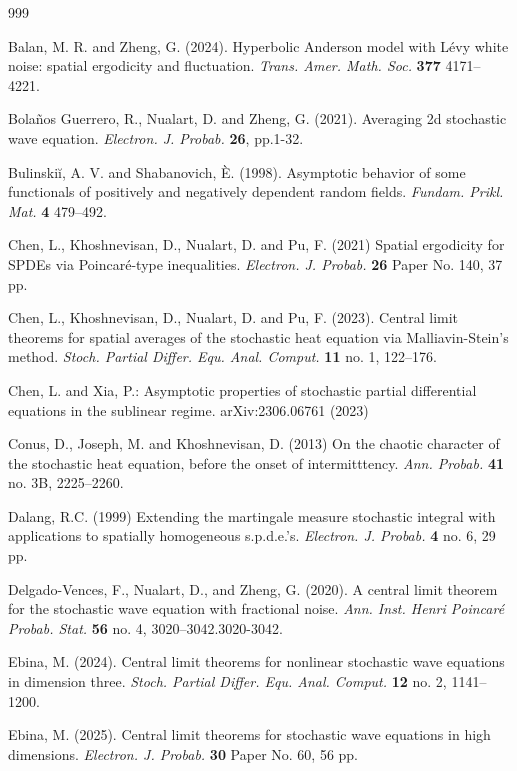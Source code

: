 \documentclass[12pt, reqno]{amsart}
\newcommand{\<}{\langle}
\renewcommand{\>}{\rangle}
\begin{document}
\begin{thebibliography}{999}

Balan, M. R. and Zheng, G. (2024).
Hyperbolic Anderson model with L\'{e}vy white noise: spatial ergodicity and fluctuation.
{\it Trans. Amer. Math. Soc.} {\bf 377} 4171--4221.


Bolaños Guerrero, R., Nualart, D. and Zheng, G. (2021). Averaging 2d stochastic wave equation. {\it Electron. J. Probab.} {\bf 26},  pp.1-32.

Bulinskiĭ, A. V. and Shabanovich, \`E. (1998).
Asymptotic behavior of some functionals of positively and negatively dependent random fields. {\it Fundam. Prikl. Mat.}
{\bf 4} 479--492.


Chen, L., Khoshnevisan, D., Nualart, D. and Pu, F. (2021)
Spatial ergodicity for SPDEs via Poincar\'{e}-type inequalities.
{\it Electron. J. Probab.} {\bf26}  Paper No. 140, 37 pp.

Chen, L., Khoshnevisan, D., Nualart, D. and Pu, F. (2023).
Central limit theorems for spatial averages of the stochastic heat equation via Malliavin-Stein's method.
{\it Stoch. Partial Differ. Equ. Anal. Comput.} {\bf11}  no. 1, 122–176.

Chen, L. and Xia, P.:
Asymptotic properties of stochastic partial differential equations in the sublinear regime. arXiv:2306.06761 (2023)


Conus, D.,  Joseph, M. and Khoshnevisan, D. (2013)
On the chaotic character of the stochastic heat equation, before the onset of intermitttency.
{\it Ann. Probab.} {\bf 41}  no. 3B, 2225–2260.

Dalang, R.C. (1999)
Extending the martingale measure stochastic integral with applications to spatially homogeneous s.p.d.e.'s. 
{\it Electron. J. Probab.} {\bf 4}  no. 6, 29 pp.

Delgado-Vences, F., Nualart, D., and Zheng, G. (2020). A central limit theorem for the stochastic wave equation with fractional noise. {\it Ann. Inst. Henri Poincar\'e Probab. Stat.}  {\bf 56}  no. 4, 3020–3042.3020-3042.

Ebina, M. (2024).
Central limit theorems for nonlinear stochastic wave equations in dimension three.
{\it Stoch. Partial Differ. Equ. Anal. Comput.} {\bf 12} no. 2, 1141–1200.

Ebina, M. (2025).
Central limit theorems for stochastic wave equations in high dimensions.
{\it Electron. J. Probab.} {\bf 30} Paper No. 60, 56 pp.


\end{thebibliography}
\end{document}
